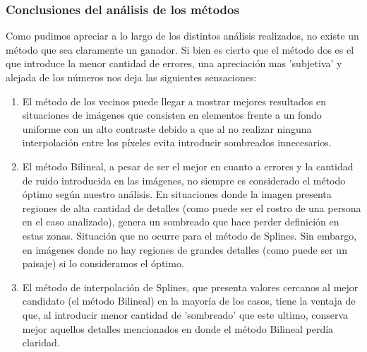 \subsubsection{Conclusiones del análisis de los métodos}
Como pudimos apreciar a lo largo de los distintos análisis realizados, no existe un método que sea claramente un ganador.
Si bien es cierto que el método dos es el que introduce la menor cantidad de errores, una apreciación mas 'subjetiva' y alejada de los números nos deja las siguientes sensaciones:
\begin{enumerate}
 \item El método de los vecinos puede llegar a mostrar mejores resultados en situaciones de imágenes que consisten en elementos frente a un fondo uniforme con un alto contraste debido a que al no realizar ninguna interpolación entre los píxeles evita introducir sombreados innecesarios.
 \item El método Bilineal, a pesar de ser el mejor en cuanto a errores y la cantidad de ruido introducida en las imágenes, no siempre es considerado el método óptimo según nuestro análisis. En situaciones donde la imagen presenta regiones de alta cantidad de detalles (como puede ser el rostro de una persona en el caso analizado), genera un sombreado que hace perder definición en estas zonas. Situación que no ocurre para el método de Splines. Sin embargo, en imágenes donde no hay regiones de grandes detalles (como puede ser un paisaje) si lo consideramos el óptimo.
 \item El método de interpolación de Splines, que presenta valores cercanos al mejor candidato (el método Bilineal) en la mayoría de los casos, tiene la ventaja de que, al introducir menor cantidad de 'sombreado' que este ultimo, conserva mejor aquellos detalles mencionados en donde el método Bilineal perdía claridad.
\end{enumerate}




